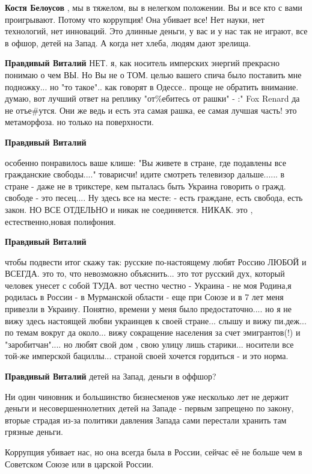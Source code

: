 \begin{itemize}
\begin{itemize}
\textbf{Костя Белоусов} , мы в тяжелом, вы в нелегком положении.
Вы и все кто с вами проигрывают.
Потому что коррупция!
Она убивает все!
Нет науки, нет технологий, нет инноваций.
Это длинные деньги, у вас и у нас так не играют, все в офшор, детей на Запад.
А когда нет хлеба, людям дают зрелища.

\textbf{Правдивый Виталий} НЕТ. я, как носитель имперских энергий прекрасно понимаю о чем ВЫ. Но Вы не о ТОМ. целью вашего спича было поставить мне подножку... но "то такое".. как говорят в Одессе.. проще не обратить внимание.
думаю, вот лучший ответ на реплику "от\%ебитесь от рашки" - :" Fox Renard да не отъе\#утся. Они же ведь и есть эта самая рашка, ее самая лучшая часть!
это метаморфоза. но только на поверхности.

\textbf{Правдивый Виталий} 

особенно понравилось ваше клише: "Вы живете в стране, где подавлены все
гражданские свободы...." товарисчи! идите смотреть телевизор дальше......  в
стране - даже не в трикстере, кем пыталась быть Украина говорить о гражд.
свободе - это песец.... Ну здесь все на месте: - есть граждане, есть свобода,
есть закон. НО ВСЕ ОТДЕЛЬНО и никак не соединяется. НИКАК.  это ,
естественно,новая полифония.

\textbf{Правдивый Виталий}

чтобы подвести итог скажу так: русские по-настоящему любят Россию ЛЮБОЙ и
ВСЕГДА. это то, что невозможно объяснить... это тот русский дух, который
человек унесет с собой ТУДА. вот честно честно - Украина - не моя Родина,я
родилась в России - в Мурманской области - еще при Союзе и в 7 лет меня
привезли в Украину. Понятно, времени у меня было предостаточно.... но я не вижу
здесь настоящей любви украинцев к своей стране... слышу и вижу пи.деж... по
темам вокруг да около... вижу сокращение населения за счет эмигрантов(!) и
"заробитчан".... но любят свой дом , свою улицу лишь старики... носители все
той-же имперской бациллы...  страной своей хочется гордиться - и это норма.

\textbf{Правдивый Виталий} детей на Запад, деньги в оффшор?

Ни один чиновник и большинство бизнесменов уже несколько лет не держит деньги и
несовершеннолетних детей на Западе - первым запрещено по закону, вторые страдая
из-за политики давления Запада сами перестали хранить там грязные деньги.

Коррупция убивает нас, но она всегда была в России, сейчас её не больше чем в
Советском Союзе или в царской России.


\end{itemize}
\end{itemize}
